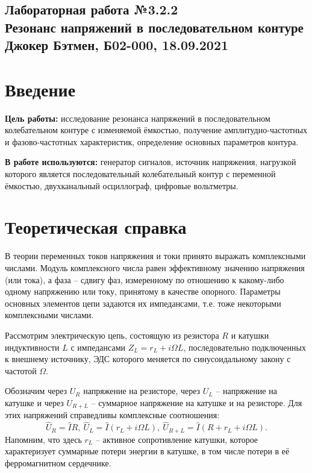 \documentclass[a4paper,10pt]{article}
\begin{document}
  
\begin{center}
  \section*{Лабораторная работа №3.2.2 \\Резонанс напряжений в последовательном контуре\\Джокер Бэтмен, Б02-000, 18.09.2021}
\end{center}  

\vspace{5mm}
\section*{Введение}

\begin{flushleft}
  \textbf{Цель работы:} исследование резонанса напряжений в последовательном колебательном контуре с изменяемой ёмкостью, получение амплитудно-частотных и фазово-частотных характеристик, определение основных параметров контура.

\end{flushleft}

\begin{flushleft}
  \textbf{В работе используются:} генератор сигналов, источник напряжения, нагрузкой которого является последовательный колебательный контур с переменной ёмкостью, двухканальный осциллограф, цифровые вольтметры.

\end{flushleft}

\section*{Теоретическая справка}

В теории переменных токов напряжения и токи принято выражать комплексными числами. Модуль комплексного числа равен эффективному значению напряжения (или тока), а фаза -- сдвигу фаз, измеренному по отношению к какому-либо одному напряжению или току, принятому в качестве опорного. Параметры основных элементов цепи задаются их импедансами, т.е. тоже некоторыми комплексными числами.

Рассмотрим электрическую цепь, состоящую из резистора $R$ и катушки индуктивности $L$ с импедансами $Z_L=r_L+i\Omega L$, последовательно подключенных к внешнему источнику, ЭДС которого меняется по синусоидальному закону с частотой $\Omega$.

Обозначим через $U_R$ напряжение на резисторе, через $U_L$ -- напряжение на катушке и через $U_{R+L}$ -- суммарное напряжение на катушке и на резисторе. Для этих напряжений справедливы комплексные соотношения:\[\hat{U}_R=\hat{I}R,\ \hat{U}_L=\hat{I}\left(r_L+i\Omega L\right),\ \hat{U}_{R+L}=\hat{I}\left(R+r_L+i\Omega L\right).\]Напомним, что здесь $r_L$ -- активное сопротивление катушки, которое характеризует суммарные потери энергии в катушке, в том числе потери в её ферромагнитном сердечнике.
\end{document}

